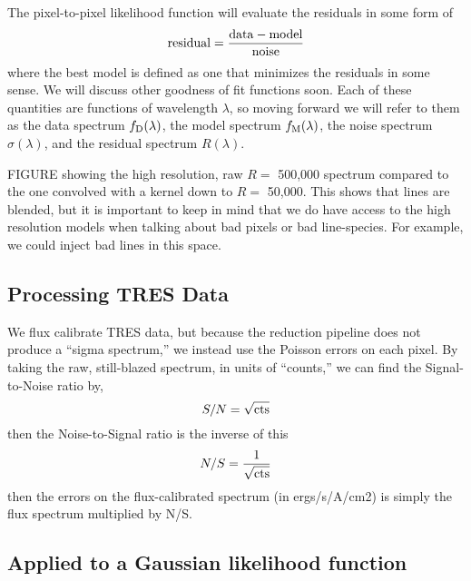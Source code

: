 \documentclass[preprint]{aastex} %
\newcommand{\fM}{f_{\rm M}}
\newcommand{\fD}{f_{\rm D}}
\begin{document}
The pixel-to-pixel likelihood function will evaluate the residuals in some form of 
\begin{equation}
  {\rm residual} = \frac{ {\rm data} - {\rm model}}{ {\rm noise}}
\end{equation}
where the best model is defined as one that minimizes the residuals in some sense. We will discuss other goodness of fit functions soon. Each of these quantities are functions of wavelength $\lambda$, so moving forward we will refer to them as the data spectrum $\fD(\lambda)$, the model spectrum $\fM(\lambda)$, the noise spectrum $\sigma(\lambda)$, and the residual spectrum $R(\lambda)$.

FIGURE showing the high resolution, raw $R =$ 500,000 spectrum compared to the one convolved with a kernel down to $R =$ 50,000. This shows that lines are blended, but it is important to keep in mind that we do have access to the high resolution models when talking about bad pixels or bad line-species. For example, we could inject bad lines in this space.

\subsection{Processing TRES Data}
We flux calibrate TRES data, but because the reduction pipeline does not produce a ``sigma spectrum,'' we instead use the Poisson errors on each pixel. By taking the raw, still-blazed spectrum, in units of ``counts,'' we can find the Signal-to-Noise ratio by,
\begin{equation}
  S/N = \sqrt{ {\rm cts}}
\end{equation}
then the Noise-to-Signal ratio is the inverse of this
\begin{equation}
  N/S = \frac{1}{\sqrt{ {\rm cts}}}
\end{equation}
then the errors on the flux-calibrated spectrum (in ergs/s/A/cm2) is simply the flux spectrum multiplied by N/S. 

\subsection{Applied to a Gaussian likelihood function}
\end{document}
